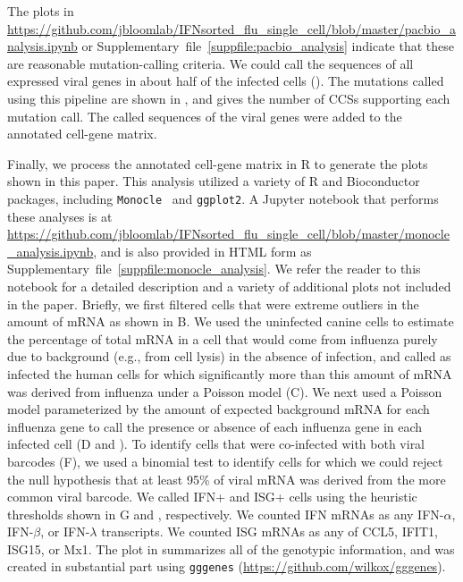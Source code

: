 \documentclass[9pt,lineno]{elife}
\begin{document}
The plots in \url{https://github.com/jbloomlab/IFNsorted_flu_single_cell/blob/master/pacbio_analysis.ipynb} or Supplementary~file~\ref{suppfile:pacbio_analysis} indicate that these are reasonable mutation-calling criteria.
We could call the sequences of all expressed viral genes in about half of the infected cells ().
The mutations called using this pipeline are shown in , and  gives the number of CCSs supporting each mutation call.
The called sequences of the viral genes were added to the annotated cell-gene matrix.

Finally, we process the annotated cell-gene matrix in R to generate the plots shown in this paper.
This analysis utilized a variety of R and Bioconductor~\citep{huber2015orchestrating} packages, including \texttt{Monocle}~\citep{qiu2017reversed, trapnell2014dynamics} and \texttt{ggplot2}.
A Jupyter notebook that performs these analyses is at \url{https://github.com/jbloomlab/IFNsorted_flu_single_cell/blob/master/monocle_analysis.ipynb}, and is also provided in HTML form as Supplementary~file~\ref{suppfile:monocle_analysis}.
We refer the reader to this notebook for a detailed description and a variety of additional plots not included in the paper.
Briefly, we first filtered cells that were extreme outliers in the amount of mRNA as shown in B.
We used the uninfected canine cells to estimate the percentage of total mRNA in a cell that would come from influenza purely due to background (e.g., from cell lysis) in the absence of infection, and called as infected the human cells for which significantly more than this amount of mRNA was derived from influenza under a Poisson model (C).
We next used a Poisson model parameterized by the amount of expected background mRNA for each influenza gene to call the presence or absence of each influenza gene in each infected cell (D and ). 
To identify cells that were co-infected with both viral barcodes (F), we used a binomial test to identify cells for which we could reject the null hypothesis that at least 95\% of viral mRNA was derived from the more common viral barcode.
We called IFN+ and ISG+ cells using the heuristic thresholds shown in G and , respectively.
We counted IFN mRNAs as any IFN-$\alpha$, IFN-$\beta$, or IFN-$\lambda$ transcripts.
We counted ISG mRNAs as any of CCL5, IFIT1, ISG15, or Mx1.
The plot in  summarizes all of the genotypic information, and was created in substantial part using \texttt{gggenes} (\url{https://github.com/wilkox/gggenes}).
\end{document}
